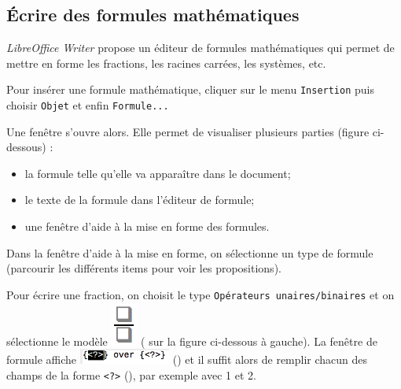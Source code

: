 


\subsection{Écrire des formules mathématiques}\label{Texte3formulesMaths}

\emph{LibreOffice Writer} propose un éditeur de formules mathématiques qui permet de mettre en forme les fractions, les racines carrées, les systèmes, etc.

Pour insérer une formule mathématique, cliquer sur le menu \texttt{Insertion} puis choisir \texttt{Objet} et enfin \texttt{Formule...}



Une fenêtre s'ouvre alors. Elle permet de visualiser plusieurs parties (figure ci-dessous) :
\begin{itemize}
\item {} la formule telle qu'elle va apparaître dans le document;
\item {} le texte de la formule dans l'éditeur de formule;
\item {} une fenêtre d'aide à la mise en forme des formules.
\end{itemize}


Dans la fenêtre d'aide à la mise en forme, on sélectionne un type de formule (parcourir les différents items pour voir les propositions).


Pour écrire une fraction, on choisit le type \texttt{Opérateurs unaires/binaires} et on sélectionne le modèle \includegraphics[width=.6cm]{./images/texte03/Texte03_Formule7} ( sur la figure ci-dessous à gauche). La fenêtre de formule affiche \includegraphics[width=3cm]{./images/texte03/Texte03_Formule8} () et il suffit alors de remplir chacun des champs de la forme \texttt{<?>} (), par exemple avec 1 et 2.

